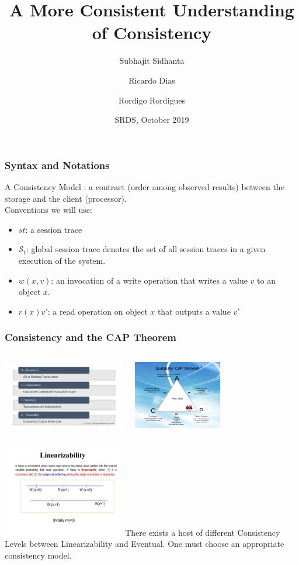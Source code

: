 \documentclass{beamer}
\title{A More Consistent Understanding of Consistency}
\author[Subhajit, Ricardo, Rordigo] %
{Subhajit Sidhanta\inst{1} \and Ricardo Dias\inst{2} \and Rordigo Rordigues\inst{3}}
\institute[] %
{
	\inst{1}%
Indian Institue of Technology Bhilai (IIT Bhilai)
	\and
	\inst{2}%
	NOVA LINCS, Universidade NOVA de Lisboa \& SUSE Linux GmbH
	\and
	\inst{3}
	INESC-ID / Instituto Superior T\'{e}cnico, ULisboa
}
\date[SRDS 2019] %
{SRDS, October 2019}
\begin{document}
 
\frame{\titlepage}
 
\begin{frame}
\frametitle{Syntax and Notations}
 A Consistency Model : a contract (order among observed results) between the storage and the client (processor).\\

Conventions we will use:
	\begin{itemize}
		\item $\mathit{st}$: a session trace
	\item $\mathcal{S}_t$: global session trace denotes the set of all
	session traces in a given execution of the system.
	 \item $w(x,v)$: an invocation of a write operation that writes a value $v$ to an object $x$.
	\item $r(x){v'}$: a read operation on object $x$ that outputs a value $v'$
	\end{itemize}
\end{frame}

\begin{frame}
\frametitle{Consistency and the CAP Theorem}
 
\begin{columns}
	
	\includegraphics[height=3cm]{acid.png}
	
	\includegraphics[height=3cm]{CAP.png}
\end{columns}
	\begin{columns}
	\includegraphics[height=4cm]{Linear.png}
	There exists a host of different Consistency Levels between Linearizability and Eventual. One must choose an appropriate consistency model.
	
\end{columns}
\end{frame}
\end{document}
